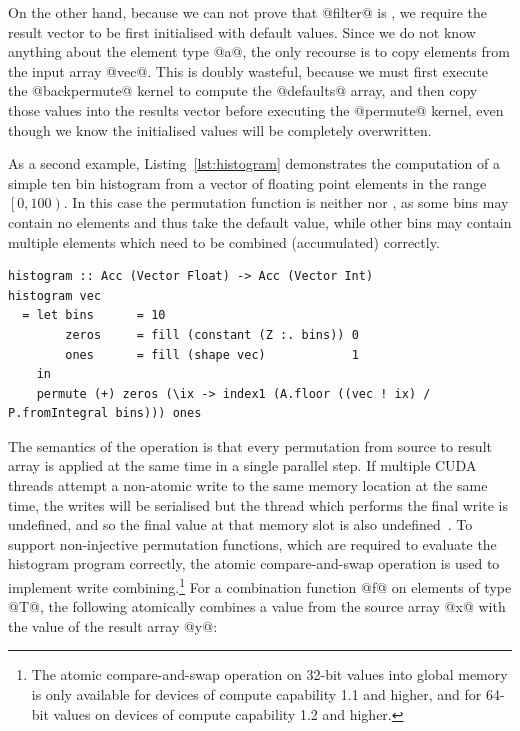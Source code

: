 On the other hand, because we can not prove that @filter@ is
, we require the result vector to be first initialised with
default values. Since we do not know anything about the element type @a@, the
only recourse is to copy elements from the input array @vec@. This is doubly
wasteful, because we must first execute the @backpermute@ kernel to compute the
@defaults@ array, and then copy those values into the results vector before
executing the @permute@ kernel, even though we know the initialised values
will be completely overwritten.

As a second example, Listing~\ref{lst:histogram} demonstrates the computation of
a simple ten bin histogram from a vector of floating point elements in the range
$\left[ 0, 100 \right)$. In this case the permutation function is neither
 nor , as some bins may contain no elements
and thus take the default value, while other bins may contain multiple elements
which need to be combined (accumulated) correctly.
%
\begin{lstlisting}[style=haskell_float
    ,label=lst:histogram
    ,caption={[A simple histogram] A simple histogram written in
    Accelerate. We assume the input vector contains elements in the range
    $\left[0,100\right)$ and accumulate into ten equally sized bins.}]
histogram :: Acc (Vector Float) -> Acc (Vector Int)
histogram vec
  = let bins      = 10
        zeros     = fill (constant (Z :. bins)) 0
        ones      = fill (shape vec)            1
    in
    permute (+) zeros (\ix -> index1 (A.floor ((vec ! ix) / P.fromIntegral bins))) ones
\end{lstlisting}

The semantics of the operation is that every permutation from source to result
array is applied at the same time in a single parallel step. If multiple
CUDA\cuda{} threads attempt a non-atomic write to the same memory location at
the same time, the writes will be serialised but the thread which performs the
final write is undefined, and so the final value at that memory slot is also
undefined~\cite{NVIDIA:2012wf}. To support non-injective permutation functions,
which are required to evaluate the histogram program correctly, the atomic
compare-and-swap operation is used to implement write combining.\footnote{The
atomic compare-and-swap operation on 32-bit values into global memory is only
available for devices of compute capability 1.1 and higher, and for 64-bit
values on devices of compute capability 1.2 and higher.} For a combination
function @f@ on elements of type @T@, the following atomically combines a value
from the source array @x@ with the value of the result array @y@:

